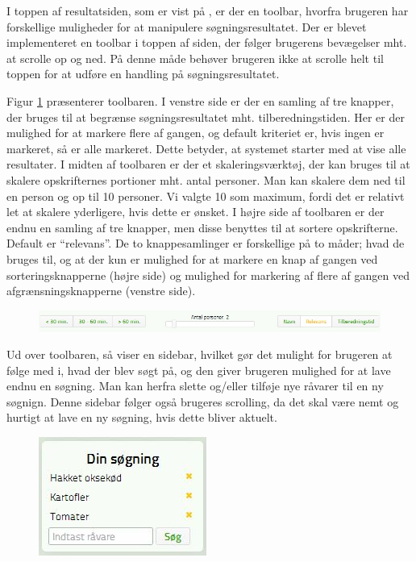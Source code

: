 I toppen af resultatsiden, som er vist på , er der en toolbar, hvorfra brugeren har forskellige muligheder for at manipulere søgningsresultatet. Der er blevet implementeret en toolbar i toppen af siden, der følger brugerens bevægelser mht. at scrolle op og ned. På denne måde behøver brugeren ikke at scrolle helt til toppen for at udføre en handling på søgningsresultatet. 

Figur \ref{fig:foodl-toolbar} præsenterer toolbaren. I venstre side er der en samling af tre knapper, der bruges til at begrænse søgningsresultatet mht. tilberedningstiden. Her er der mulighed for at markere flere af gangen, og default kriteriet er, hvis ingen er markeret, så er alle markeret. Dette betyder, at systemet starter med at vise alle resultater. 
I midten af toolbaren er der et skaleringsværktøj, der kan bruges til at skalere opskrifternes portioner mht. antal personer. Man kan skalere dem ned til en person og op til 10 personer. Vi valgte 10 som maximum, fordi det er relativt let at skalere yderligere, hvis dette er ønsket. 
I højre side af toolbaren er der endnu en samling af tre knapper, men disse benyttes til at sortere opskrifterne. Default er ``relevans''. De to knappesamlinger er forskellige på to måder; hvad de bruges til, og at der kun er mulighed for at markere en knap af gangen ved sorteringsknapperne (højre side) og mulighed for markering af flere af gangen ved afgrænsningsknapperne (venstre side).

\begin{figure}[H]
	\centering
	\includegraphics[scale=0.7]{billeder/foodl/toolbar.jpg}
	\label{fig:foodl-toolbar}
\end{figure}

Ud over toolbaren, så viser  en sidebar, hvilket gør det mulight for brugeren at følge med i, hvad der blev søgt på, og den giver brugeren mulighed for at lave endnu en søgning. Man kan herfra slette og/eller tilføje nye råvarer til en ny søgnign. Denne sidebar følger også brugeres scrolling, da det skal være nemt og hurtigt at lave en ny søgning, hvis dette bliver aktuelt.

\begin{figure}[H]
	\centering
	\includegraphics[scale=0.7]{billeder/foodl/sidebar.jpg}
	\label{fig:foodl-sidebar}
\end{figure}

